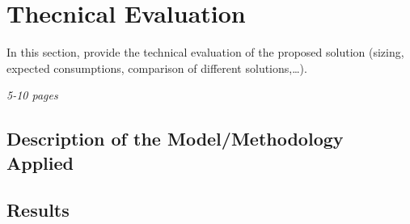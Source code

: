 \newpage
\chapter{Thecnical Evaluation}
In this section, provide the technical evaluation of the proposed solution (sizing, expected consumptions, comparison of different solutions,…).

\textit{5-10 pages}

\section{Description of the Model/Methodology Applied}
\section{Results}